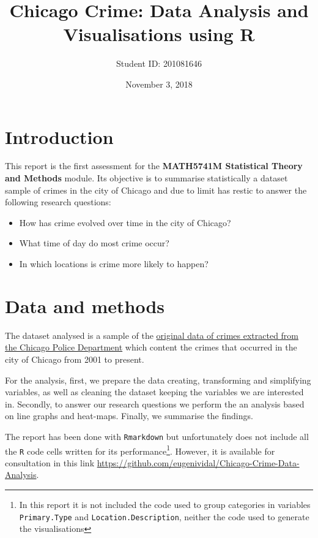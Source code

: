 \documentclass[]{article}
\title{Chicago Crime: Data Analysis and Visualisations using R}
\author{Student ID: 201081646}
\date{November 3, 2018}
\let\rmarkdownfootnote\footnote%
\def\footnote{\protect\rmarkdownfootnote}
\begin{document}
\maketitle

\section{Introduction}\label{introduction}

This report is the first assessment for the \textbf{MATH5741M
Statistical Theory and Methods} module. Its objective is to summarise
statistically a dataset sample of crimes in the city of Chicago and due
to limit has restic to answer the following research questions:

\begin{itemize}
\item
  How has crime evolved over time in the city of Chicago?
\item
  What time of day do most crime occur?
\item
  In which locations is crime more likely to happen?
\end{itemize}

\section{Data and methods}\label{data-and-methods}

The dataset analysed is a sample of the
\href{https://data.cityofchicago.org/Public-Safety/Crimes-2001-to-present/ijzp-q8t2}{original
data of crimes extracted from the Chicago Police Department} which
content the crimes that occurred in the city of Chicago from 2001 to
present.

For the analysis, first, we prepare the data creating, transforming and
simplifying variables, as well as cleaning the dataset keeping the
variables we are interested in. Secondly, to answer our research
questions we perform the an analysis based on line graphs and heat-maps.
Finally, we summarise the findings.

The report has been done with \texttt{Rmarkdown} but unfortunately does
not include all the \texttt{R} code cells written for its
performance\footnote{In this report it is not included the code used to
  group categories in variables \texttt{Primary.Type} and
  \texttt{Location.Description}, neither the code used to generate the
  visualisations}. However, it is available for consultation in this
link \url{https://github.com/eugenividal/Chicago-Crime-Data-Analysis}.
\end{document}
